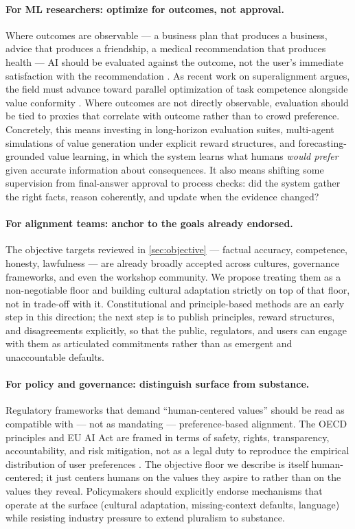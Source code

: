 \documentclass{article}
\theoremstyle{plain}
\theoremstyle{definition}
\theoremstyle{remark}
\begin{document}
\paragraph{For ML researchers: optimize for outcomes, not approval.} Where outcomes are observable --- a business plan that produces a business, advice that produces a friendship, a medical recommendation that produces health --- AI should be evaluated against the outcome, not the user's immediate satisfaction with the recommendation \citep{sharma2023sycophancy}. As recent work on superalignment argues, the field must advance toward parallel optimization of task competence alongside value conformity \citep{kim2025superalignment}. Where outcomes are not directly observable, evaluation should be tied to proxies that correlate with outcome rather than to crowd preference. Concretely, this means investing in long-horizon evaluation suites, multi-agent simulations of value generation under explicit reward structures, and forecasting-grounded value learning, in which the system learns what humans \emph{would prefer} given accurate information about consequences. It also means shifting some supervision from final-answer approval to process checks: did the system gather the right facts, reason coherently, and update when the evidence changed?

\paragraph{For alignment teams: anchor to the goals already endorsed.} The objective targets reviewed in \cref{sec:objective} --- factual accuracy, competence, honesty, lawfulness --- are already broadly accepted across cultures, governance frameworks, and even the workshop community. We propose treating them as a non-negotiable floor and building cultural adaptation strictly on top of that floor, not in trade-off with it. Constitutional and principle-based methods \citep{bai2022constitutional} are an early step in this direction; the next step is to publish principles, reward structures, and disagreements explicitly, so that the public, regulators, and users can engage with them as articulated commitments rather than as emergent and unaccountable defaults.

\paragraph{For policy and governance: distinguish surface from substance.} Regulatory frameworks that demand ``human-centered values'' \citep{oecd2019ai, eu2024aiact} should be read as compatible with --- not as mandating --- preference-based alignment. The OECD principles and EU AI Act are framed in terms of safety, rights, transparency, accountability, and risk mitigation, not as a legal duty to reproduce the empirical distribution of user preferences \citep{oecd2019ai, eu2024aiact}. The objective floor we describe is itself human-centered; it just centers humans on the values they aspire to rather than on the values they reveal. Policymakers should explicitly endorse mechanisms that operate at the surface (cultural adaptation, missing-context defaults, language) while resisting industry pressure to extend pluralism to substance.
\end{document}
